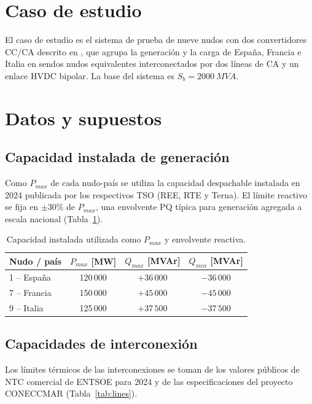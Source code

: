 \documentclass[12pt,a4paper]{iit-project-draft-report}
\begin{document}
\section{Caso de estudio}
\label{sec:case}

El caso de estudio es el sistema de prueba de nueve nudos con dos
convertidores \gls{CC}/\gls{CA} descrito en \cite{TomasMartin2026}, que
agrupa la generación y la carga de España, Francia e Italia en sendos
nudos equivalentes interconectados por dos líneas de \gls{CA} y un enlace
\gls{HVDC} bipolar. La base del sistema es $S_b = \SI{2000}{MVA}$.

\section{Datos y supuestos}
\label{sec:data}

\subsection{Capacidad instalada de generación}

Como $P_{max}$ de cada nudo-país se utiliza la capacidad despachable
instalada en 2024 publicada por los respectivos \gls{TSO} (\gls{REE},
\gls{RTE} y \gls{Terna}). El límite reactivo se fija en $\pm 30\%$ de
$P_{max}$, una envolvente PQ típica para generación agregada a escala
nacional (Tabla~\ref{tab:gencap}).

\begin{table}[h]
\centering
\caption{Capacidad instalada utilizada como $P_{max}$ y envolvente reactiva.}
\label{tab:gencap}
\begin{tabular}{lccc}
\toprule
Nudo / país & $P_{max}$ [MW] & $Q_{max}$ [MVAr] & $Q_{min}$ [MVAr] \\
\midrule
1 -- España & 120\,000 & $+36\,000$ & $-36\,000$ \\
7 -- Francia & 150\,000 & $+45\,000$ & $-45\,000$ \\
9 -- Italia & 125\,000 & $+37\,500$ & $-37\,500$ \\
\bottomrule
\end{tabular}
\end{table}

\subsection{Capacidades de interconexión}

Los límites térmicos de las interconexiones se toman de los valores
públicos de \gls{NTC} comercial de \gls{ENTSOE} para 2024 y de las
especificaciones del proyecto CONECCMAR (Tabla~\ref{tab:lines}).
\end{document}
